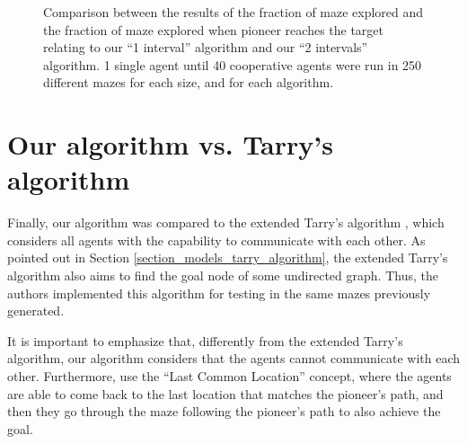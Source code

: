 \begin{figure}
    \centering
    \qquad
    \qquad
    \newline
    \qquad
    \qquad
    \newline
    \qquad
    \caption{Comparison between the results of the fraction of maze explored and the fraction of maze explored when pioneer reaches the target relating to our ``1 interval'' algorithm and our ``2 intervals'' algorithm. 1 single agent until 40 cooperative agents were run in 250 different mazes for each size, and for each algorithm.}
    \label{our_algorithm_1I_vs_2I_fraction}
\end{figure}

\section{Our algorithm vs. Tarry's algorithm}
\label{section_results_tarry_vs_our}

Finally, our algorithm was compared to the extended Tarry's algorithm \cite{KivelevitchCohen2010}, which considers all agents with the capability to communicate with each other. As pointed out in Section \ref{section_models_tarry_algorithm}, the extended Tarry's algorithm also aims to find the goal node of some undirected graph. Thus, the authors implemented this algorithm for testing in the same mazes previously generated.

It is important to emphasize that, differently from the extended Tarry's algorithm, our algorithm considers that the agents cannot communicate with each other. Furthermore,  use the ``Last Common Location'' concept, where the agents are able to come back to the last location that matches the pioneer's path, and then they go through the maze following the pioneer's path to also achieve the goal.

